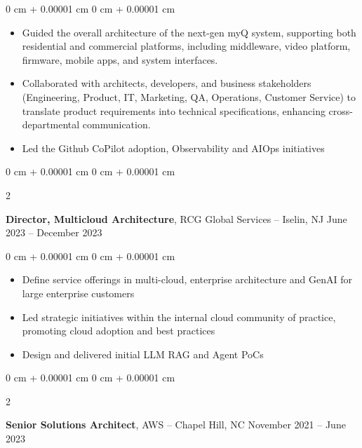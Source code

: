 \documentclass[10pt, letterpaper]{article}
\newenvironment{highlights}{
    \begin{itemize}[
        topsep=0.10 cm,
        parsep=0.10 cm,
        partopsep=0pt,
        itemsep=0pt,
        leftmargin=0 cm + 10pt
    ]
}{
    \end{itemize}
} %
\newenvironment{onecolentry}{
    \begin{adjustwidth}{
        0 cm + 0.00001 cm
    }{
        0 cm + 0.00001 cm
    }
}{
    \end{adjustwidth}
} %
\newenvironment{twocolentry}[2][]{
    \onecolentry
    \def\secondColumn{#2}
    \setcolumnwidth{\fill, 4.5 cm}
    \begin{paracol}{2}
}{
    \switchcolumn \raggedleft \secondColumn
    \end{paracol}
    \endonecolentry
} %
\begin{document}
        \vspace{0.10 cm}
        \begin{onecolentry}
            \begin{highlights}
                \item Guided the overall architecture of the next-gen myQ system, supporting both residential and commercial platforms, including middleware, video platform, firmware, mobile apps, and system interfaces.
                \item Collaborated with architects, developers, and business stakeholders (Engineering, Product, IT, Marketing, QA, Operations, Customer Service) to translate product requirements into technical specifications, enhancing cross-departmental communication.
                \item Led the Github CoPilot adoption, Observability and AIOps initiatives
            \end{highlights}
        \end{onecolentry}

        \vspace{0.2 cm}

        \begin{twocolentry}{
            June 2023 – December 2023
        }
            \textbf{Director, Multicloud Architecture}, RCG Global Services -- Iselin, NJ\end{twocolentry}

        \vspace{0.10 cm}
        \begin{onecolentry}
            \begin{highlights}
                \item Define service offerings in multi-cloud, enterprise architecture and GenAI for large enterprise customers 
                \item Led strategic initiatives within the internal cloud community of practice, promoting cloud adoption and best practices
                \item Design and delivered initial LLM RAG and Agent PoCs 
            \end{highlights}
        \end{onecolentry}

        \vspace{0.10 cm}
        \begin{twocolentry}{
            November 2021 – June 2023
        }
            \textbf{Senior Solutions Architect}, AWS -- Chapel Hill, NC\end{twocolentry}
\end{document}
